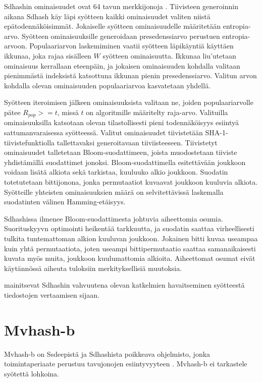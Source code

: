 Sdhashin ominaisuudet ovat 64 tavun merkkijonoja \citep{roussev10}. Tiivisteen generoinnin aikana Sdhash käy
läpi syötteen kaikki ominaisuudet valiten niistä epätodennäköisimmät.
Jokaiselle syötteen ominaisuudelle määritetään entropia-arvo.
Syötteen ominaisuuksille generoidaan presedenssiarvo perustuen entropia-arvoon.
Populaariarvon laskemiminen vaatii syötteen läpikäyntiä käyttäen ikkunaa, joka
rajaa sisälleen $W$ syötteen ominaisuutta. Ikkunaa liu'utetaan ominaisuus
kerrallaan eteenpäin, ja jokaisen ominaisuuden kohdalla valitaan pienimmästä
indeksistä katsottuna ikkunan pienin presedenssiarvo. Valitun arvon kohdalla
olevan ominaisuuden populaariarvoa kasvatetaan yhdellä.

Syötteen iteroimisen jälkeen ominaisuuksista valitaan ne, joiden populaariarvolle
pätee $R_{pop} >= t$, missä $t$ on algoritmille määritelty raja-arvo. Valituilla
ominaisuuksilla katsotaan olevan tilastollisesti pieni todennäköisyys esiintyä
sattumanvaraisessa syötteessä. Valitut ominaisuudet tiivistetään
SHA-1-tiivistefunktiolla tallettavaksi generoitavaan tiiviisteeseen.
Tiivistetyt ominaisuudet talletetaan Bloom-suodattimeen, joista
muodostetaan tiiviste yhdistämällä suodattimet jonoksi.
Bloom-suodattimella esitettävään joukkoon voidaan lisätä alkiota sekä tarkistaa,
kuuluuko alkio joukkoon. Suodatin totetutetaan bittijonona, jonka permutaatiot
kuvaavat joukkoon kuuluvia alkiota. Syötteille yhteisten ominaisuuksien määrä
on selvitettävissä laskemalla suodatinten välinen Hamming-etäisyys.

Sdhashissa ilmenee Bloom-suodattimesta johtuvia aiheettomia
osumia. Suorituskyyvn optimointi heikentää tarkkuutta,
ja suodatin saattaa virheellisesti tulkita tuntemattoman
alkion kuuluvan joukkoon. Jokainen bitti kuvaa useampaa kuin yhtä
permutaatiota, joten useampi bittipermutaatio saattaa
samanaikaisesti kuvata myös muita, joukkoon kuulumattomia
alkioita. Aiheettomat osumat eivät käytännössä aiheuta tuloksiin merkityksellisiä muutoksia.

\textcite{breitinger12} mainitsevat Sdhashin vahvuutena olevan katkelmien havaitseminen syötteestä
tiedostojen vertaamisen sijaan.

\section{Mvhash-b}

Mvhash-b on Ssdeepistä ja Sdhashista poikkeava ohjelmisto, jonka toimintaperiaate
perustuu tavujonojen esiintyvyyteen \parencite{martin-perez21}. Mvhash-b ei
tarkastele syötettä lohkoina.

